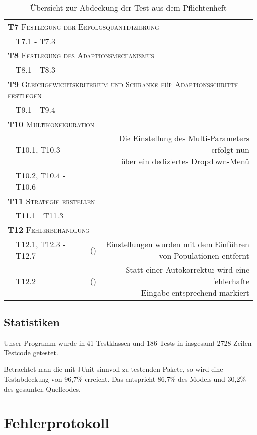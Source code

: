\documentclass[parskip=full,11pt,openany]{scrreprt}
\newcommand{\cmark}{\ding{51}}%
\newcommand{\xmark}{\ding{55}}%
\begin{document}
\begin{table}[h]
\begin{tabular}{@{}ll|c|r@{}}
		\multicolumn{4}{l}{\small \textsc{\textbf{T7} Festlegung der Erfolgsquantifizierung}}\\ 
		&T7.1 - T7.3 & \cmark & \\
		\multicolumn{4}{l}{\small \textsc{\textbf{T8} Festlegung des Adaptionsmechanismus}}\\ 
		&T8.1 - T8.3 & \cmark & \\
		\multicolumn{4}{l}{\small \textsc{\textbf{T9} Gleichgewichtskriterium und Schranke für Adaptionsschritte festlegen}}\\ 
		&T9.1 - T9.4 & \cmark & \\
		\multicolumn{3}{l|}{\small \textsc{\textbf{T10} Multikonfiguration}}\\ 
		&T10.1, T10.3 & \cmark & \makecell{Die Einstellung des Multi-Parameters erfolgt nun\\ über ein dediziertes Dropdown-Menü}\\
		&T10.2, T10.4 - T10.6 & \cmark & \\
		\multicolumn{3}{l|}{\small \textsc{\textbf{T11} Strategie erstellen}}\\
		&T11.1 - T11.3 & \cmark & \\
		\multicolumn{3}{l|}{\small \textsc{\textbf{T12} Fehlerbehandlung}}\\ 
		&T12.1, T12.3 - T12.7 & (\xmark) & \makecell{Einstellungen wurden mit dem Einführen\\ von Populationen entfernt}\\
		&T12.2 & (\cmark) & \makecell{Statt einer Autokorrektur wird eine fehlerhafte\\ Eingabe entsprechend markiert}\\
		\bottomrule
	\end{tabular}
	\caption{Übersicht zur Abdeckung der Test aus dem Pflichtenheft}
\end{table}

\section{Statistiken}

Unser Programm wurde in 41 Testklassen und 186 Tests in insgesamt 2728 Zeilen Testcode getestet.

Betrachtet man die mit JUnit sinnvoll zu testenden Pakete, so wird eine Testabdeckung von 96,7\% erreicht. Das entspricht 86,7\% des Models und 30,2\% des gesamten Quellcodes.

\chapter{Fehlerprotokoll}
\end{document}
